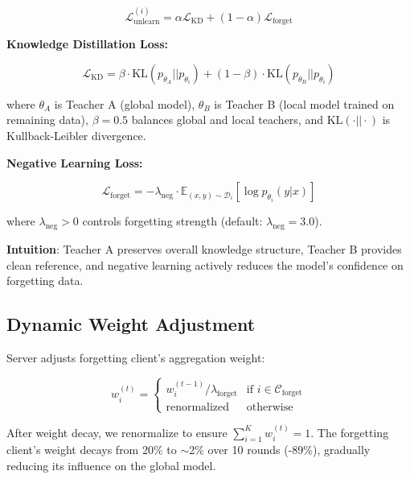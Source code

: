 \documentclass[10pt,twocolumn]{article}
\begin{document}
\begin{equation}
\mathcal{L}_{\text{unlearn}}^{(i)} = \alpha \mathcal{L}_{\text{KD}} + (1 - \alpha) \mathcal{L}_{\text{forget}}
\end{equation}

\textbf{Knowledge Distillation Loss:}

\begin{equation}
\mathcal{L}_{\text{KD}} = \beta \cdot \text{KL}(p_{\theta_A} || p_{\theta_i}) + (1 - \beta) \cdot \text{KL}(p_{\theta_B} || p_{\theta_i})
\end{equation}

where $\theta_A$ is Teacher A (global model), $\theta_B$ is Teacher B (local model trained on remaining data), $\beta = 0.5$ balances global and local teachers, and $\text{KL}(\cdot || \cdot)$ is Kullback-Leibler divergence.

\textbf{Negative Learning Loss:}

\begin{equation}
\mathcal{L}_{\text{forget}} = -\lambda_{\text{neg}} \cdot \mathbb{E}_{(x, y) \sim \mathcal{D}_i} [\log p_{\theta_i}(y | x)]
\end{equation}

where $\lambda_{\text{neg}} > 0$ controls forgetting strength (default: $\lambda_{\text{neg}} = 3.0$).

\textbf{Intuition}: Teacher A preserves overall knowledge structure, Teacher B provides clean reference, and negative learning actively reduces the model's confidence on forgetting data.

\subsection{Dynamic Weight Adjustment}

Server adjusts forgetting client's aggregation weight:

\begin{equation}
w_i^{(t)} = \begin{cases}
w_i^{(t-1)} / \lambda_{\text{forget}} & \text{if } i \in \mathcal{C}_{\text{forget}} \\
\text{renormalized} & \text{otherwise}
\end{cases}
\end{equation}

After weight decay, we renormalize to ensure $\sum_{i=1}^{K} w_i^{(t)} = 1$. The forgetting client's weight decays from 20\% to $\sim$2\% over 10 rounds (-89\%), gradually reducing its influence on the global model.
\end{document}

